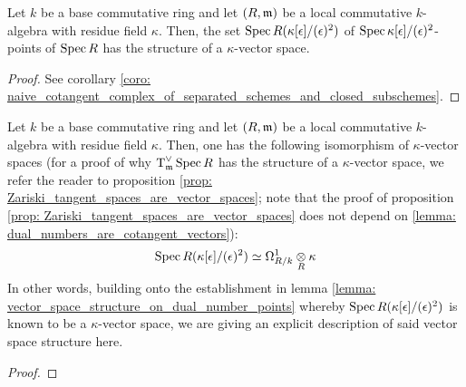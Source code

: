             \begin{lemma} \label{lemma: vector_space_structure_on_dual_number_points}
                Let $k$ be a base commutative ring and let $(R, \mathfrak{m})$ be a local commutative $k$-algebra with residue field $\kappa$. Then, the set $\operatorname{Spec} R(\kappa[\epsilon]/(\epsilon)^2)$ of $\operatorname{Spec} \kappa[\epsilon]/(\epsilon)^2$-points of $\operatorname{Spec} R$ has the structure of a $\kappa$-vector space. 
            \end{lemma}
                \begin{proof}
                    See corollary \ref{coro: naive_cotangent_complex_of_separated_schemes_and_closed_subschemes}.
                \end{proof}
            
            \begin{lemma} \label{lemma: dual_numbers_are_cotangent_vectors} 
                Let $k$ be a base commutative ring and let $(R, \mathfrak{m})$ be a local commutative $k$-algebra with residue field $\kappa$. Then, one has the following isomorphism of $\kappa$-vector spaces (for a proof of why $\operatorname{T}^{\vee}_{\mathfrak{m}}\operatorname{Spec} R$ has the structure of a $\kappa$-vector space, we refer the reader to proposition \ref{prop: Zariski_tangent_spaces_are_vector_spaces}; note that the proof of proposition \ref{prop: Zariski_tangent_spaces_are_vector_spaces} does not depend on \ref{lemma: dual_numbers_are_cotangent_vectors}):
                    $$\Spec R(\kappa[\e]/(\e)^2) \cong \Omega^1_{R/k} \tensor_R \kappa$$
                In other words, building onto the establishment in lemma \ref{lemma: vector_space_structure_on_dual_number_points} whereby $\operatorname{Spec} R(\kappa[\epsilon]/(\epsilon)^2)$ is known to be a $\kappa$-vector space, we are giving an explicit description of said vector space structure here.
            \end{lemma}
                \begin{proof}
                    
                \end{proof}
            
